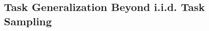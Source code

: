 




\subsection{Task Generalization Beyond i.i.d. Task Sampling }\label{sec: Experiment beyond iid sampling}





